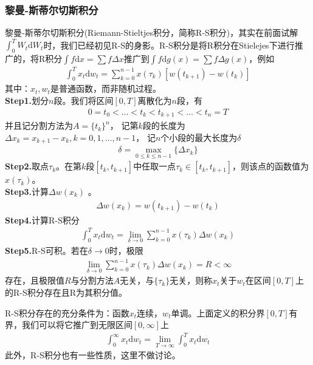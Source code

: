         \subsubsection{黎曼-斯蒂尔切斯积分}
            \label{subsubsec:黎曼-斯蒂尔切斯积分}
            \par
            黎曼-斯蒂尔切斯积分(Riemann-Stieltjes积分，简称R-S积分)，其实在前面试解$\int_0^T W_t\mathrm{d}W_t$时，我们已经初见R-S的身影。R-S积分是将R积分在Stielejes下进行推广的，将R积分$\int f\mathrm{d}x = \sum f \Delta x$推广到$\int f\mathrm{d}g(x) = \sum f \Delta g(x)$，例如
            \begin{align*}
                \int_0 ^T x_t \mathrm{d} w_t = \sum_{k = 0}^{n-1} x(\tau_k) [w(t_{k+1}) - w(t_k)]
            \end{align*}
            其中：$x_t,w_t$是普通函数，而非随机过程。\\
            \textbf{Step1.}划分$n$段。我们将区间$[0,T]$离散化为$n$段，有
            \begin{align*}
                0 = t_0 <\dots <t_k < t_{k+1} <\dots<t_n = T
            \end{align*}
            并且记分割方法为$A = \{t_k\}^n$，
            记第$k$段的长度为$\Delta x_k = x_{k+1}-x_k,k = 0,1,\dots,n - 1$，
            记$n$个小段的最大长度为$\delta$
            \begin{align*}
                \delta = \max_{0 \leqslant k \leqslant n-1}\{\Delta x_k\}
            \end{align*}
            \textbf{Step2.}取点$\tau_k$。在第$k$段$[t_{k},t_{k+1}]$中任取一点$\tau_k\in [t_{k},t_{k+1}]$，则该点的函数值为$x(\tau_k)$。\\
            \textbf{Step3.}计算$\Delta w(x_k)$ 。
            \begin{align*}
            \Delta w(x_k) = w(t_{k+1}) - w(t_k)
            \end{align*}
            \textbf{Step4.}计算R-S积分
            \begin{align*}
                \int_0^T x_t\mathrm{d}w_t = \lim_{\delta \rightarrow 0} \sum_{k = 0}^{n-1} x(\tau_k)\Delta w(x_k)
            \end{align*}
            \textbf{Step5.}R-S可积。若在$\delta\rightarrow 0$时，极限
            \begin{align*}
                \lim_{\delta \rightarrow 0} \sum_{k = 0}^{n-1} x(\tau_k)\Delta w(x_k) = R<\infty
            \end{align*}
            存在，且极限值$R$与分割方法$A$无关，与$\{\tau_k\}$无关，则称$x_t$关于$w_t$在区间$[0,T]$上的R-S积分存在且R为其积分值。
            \par
            R-S积分存在的充分条件为：函数$x_t$连续，$w_t$单调。上面定义的积分界$[0,T]$有界，我们可以将它推广到无限区间$[0,\infty]$上
            \begin{align*}
            \int_0^\infty x_t\mathrm{d}w_t = \lim_{T \rightarrow \infty} \int_0^T x_t\mathrm{d}w_t
            \end{align*}
            此外，R-S积分也有一些性质，这里不做讨论。

